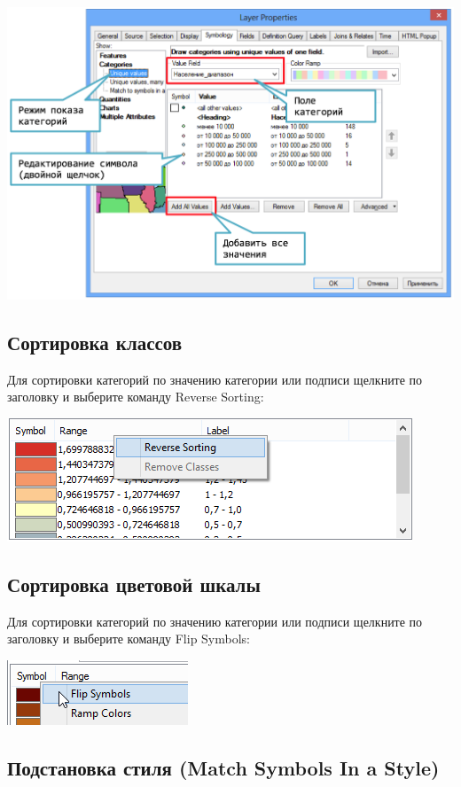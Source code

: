 \documentclass[]{book}
\theoremstyle{definition}
\theoremstyle{definition}
\theoremstyle{definition}
\theoremstyle{remark}
\begin{document}
\includegraphics{images/Appendix/image16.png}

\hypertarget{-}{%
\subsection{Сортировка классов}\label{-}}

Для сортировки категорий по значению категории или подписи щелкните по
заголовку и выберите команду Reverse Sorting:

\includegraphics{images/Appendix/image17.png}

\hypertarget{--}{%
\subsection{Сортировка цветовой шкалы}\label{--}}

Для сортировки категорий по значению категории или подписи щелкните по
заголовку и выберите команду Flip Symbols:

\includegraphics{images/Appendix/image18.png}

\hypertarget{--match-symbols-in-a-style}{%
\subsection{Подстановка стиля (Match Symbols In a
Style)}\label{--match-symbols-in-a-style}}
\end{document}
